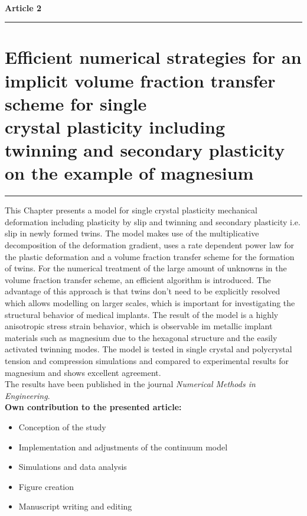 \ \vspace{1cm} \\
\Large {\bf Article 2}
\normalsize
\vspace{0.3cm}
\hrule
\section*{\Large \centering Efficient numerical strategies for an implicit
volume fraction transfer scheme for single \\ crystal plasticity including twinning and secondary plasticity on the example of magnesium}
\hrule
\vspace{1.5cm}

This Chapter presents a model for single crystal plasticity mechanical deformation including plasticity by slip and twinning and secondary plasticity i.e. slip in newly formed twins. The model makes use of the multiplicative decomposition of the deformation gradient, uses a rate dependent power law for the plastic deformation and a volume fraction transfer scheme for the formation of twins. For the numerical treatment of the large amount of unknowns in the volume fraction transfer scheme, an efficient algorithm is introduced. The advantage of this approach is that twins don't need to be explicitly resolved which allows modelling on larger scales, which is important for investigating the structural behavior of medical implants. The result of the model is a highly anisotropic stress strain behavior, which is observable im metallic implant materials such as magnesium due to the hexagonal structure and the easily activated twinning modes. The model is tested in single crystal and polycrystal tension and compression simulations and compared to experimental results for magnesium and shows excellent agreement. \\

The results have been published in the journal \textit{Numerical Methods in Engineering}. \\

\textbf{Own contribution to the presented article:}
\begin{itemize}
\item Conception of the study
\item Implementation and adjustments of the continuum model
\item Simulations and data analysis
\item Figure creation 
\item Manuscript writing and editing
\end{itemize}
\newpage

